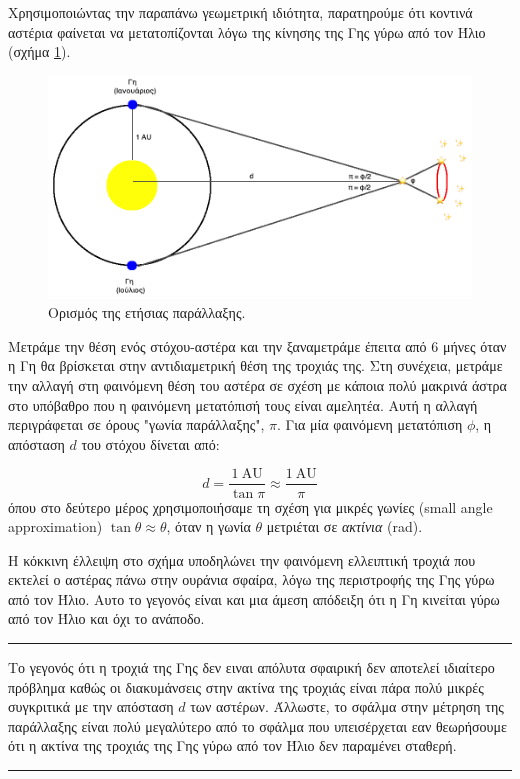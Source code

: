 Χρησιμοποιώντας την παραπάνω γεωμετρική ιδιότητα, παρατηρούμε ότι κοντινά αστέρια φαίνεται να μετατοπίζονται λόγω της κίνησης της Γης γύρω από τον Ήλιο (σχήμα \ref{fig:parallax}).

\begin{figure}[h]
    \centering
    \includegraphics[width=\linewidth]{Figures/parallax.png}
    \caption{Ορισμός της ετήσιας παράλλαξης.}
    \label{fig:parallax}
\end{figure}

Μετράμε την θέση ενός στόχου-αστέρα και την ξαναμετράμε έπειτα από 6 μήνες όταν η Γη θα βρίσκεται στην αντιδιαμετρική θέση της τροχιάς της. Στη συνέχεια, μετράμε την αλλαγή στη φαινόμενη θέση του αστέρα σε σχέση με κάποια πολύ μακρινά άστρα στο υπόβαθρο που η φαινόμενη μετατόπισή τους είναι αμελητέα. Αυτή η αλλαγή περιγράφεται σε όρους "γωνία παράλλαξης", $\pi$. Για μία φαινόμενη μετατόπιση $\phi$, η απόσταση $d$ του στόχου δίνεται από:

\begin{equation}
    d = \frac{1 \ \text{AU}}{\tan \pi} \approx \frac{1 \ \text{AU}}{\pi}
\end{equation}
όπου στο δεύτερο μέρος χρησιμοποιήσαμε τη σχέση για μικρές γωνίες (small angle approximation) $\tan \theta \approx \theta$, όταν η γωνία $\theta$ μετριέται σε \textit{ακτίνια} (rad).

Η κόκκινη έλλειψη στο σχήμα υποδηλώνει την φαινόμενη ελλειπτική τροχιά που εκτελεί ο αστέρας πάνω στην ουράνια σφαίρα, λόγω της περιστροφής της Γης γύρω από τον Ήλιο. Αυτο το γεγονός είναι και μια άμεση απόδειξη ότι η Γη κινείται γύρω από τον Ήλιο και όχι το ανάποδο.
\\
{\color{red} \hrule }
Το γεγονός ότι η τροχιά της Γης δεν ειναι απόλυτα σφαιρική δεν αποτελεί ιδιαίτερο πρόβλημα καθώς οι διακυμάνσεις στην ακτίνα της τροχιάς είναι πάρα πολύ μικρές συγκριτικά με την απόσταση $d$ των αστέρων. Άλλωστε, το σφάλμα στην μέτρηση της παράλλαξης είναι πολύ μεγαλύτερο από το σφάλμα που υπεισέρχεται εαν θεωρήσουμε ότι η ακτίνα της τροχιάς της Γης γύρω από τον Ήλιο δεν παραμένει σταθερή.
{\color{red} \hrule }

